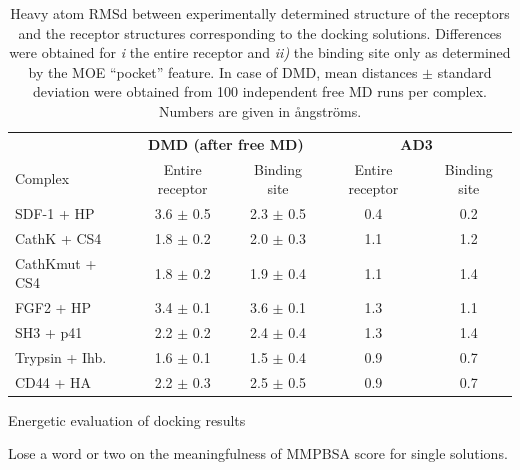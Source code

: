 \begin{table}
\tiny
\centering
\renewcommand{\arraystretch}{1.3}
\begin{tabular}{@{}lcccc@{}}
\toprule
& \multicolumn{2}{c}{\textbf{DMD (after free MD)}} & \multicolumn{2}{c}{\textbf{AD3}} \\
Complex & Entire receptor & Binding site &  Entire receptor & Binding site \\
\midrule
SDF-1 + HP & 3.6 $\pm$ 0.5 & 2.3 $\pm$ 0.5 &  0.4 & 0.2 \\
CathK + CS4 & 1.8 $\pm$ 0.2 & 2.0 $\pm$ 0.3 & 1.1 & 1.2 \\
CathKmut + CS4 & 1.8 $\pm$ 0.2 & 1.9 $\pm$ 0.4 & 1.1 & 1.4 \\
FGF2 + HP & 3.4 $\pm$ 0.1 & 3.6 $\pm$ 0.1 & 1.3 & 1.1 \\
SH3 + p41 & 2.2 $\pm$ 0.2&  2.4 $\pm$ 0.4 &  1.3 & 1.4 \\
Trypsin + Ihb. & 1.6 $\pm$ 0.1 & 1.5 $\pm$ 0.4 & 0.9 & 0.7 \\
CD44 + HA & 2.2 $\pm$ 0.3 & 2.5 $\pm$ 0.5 & 0.9 & 0.7 \\
\bottomrule
\end{tabular}
\caption{
Heavy atom RMSd between experimentally determined structure of the receptors and
the receptor structures corresponding to the docking solutions. Differences were
obtained for \textit{i} the entire receptor and \textit{ii)} the binding site
only as determined by the MOE \enquote{pocket} feature. In case of DMD, mean
distances $\pm$ standard deviation were obtained from 100 independent free MD
runs per complex. Numbers are given in ångströms.
}
\label{tab:dmd:binding_site_rmsd}
\end{table}


{\sffamily Energetic evaluation of docking results}

Lose a word or two on the meaningfulness of MMPBSA score for single
solutions.


